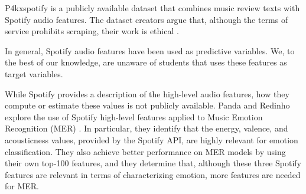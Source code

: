 \documentclass[sn-mathphys]{sn-jnl}%
\theoremstyle{thmstyleone}%
\theoremstyle{thmstyletwo}%
\theoremstyle{thmstylethree}%
\begin{document}
P4kxspotify is a publicly available dataset that combines music review texts with Spotify audio features.
The dataset creators argue that, although the terms of service prohibits scraping, their work is ethical \cite{pinter2020p4kxspotify}.

In general, Spotify audio features have been used as predictive variables.
We, to the best of our knowledge, are unaware of students that uses these features as target variables.


While Spotify provides a description of the high-level audio features, how they compute or estimate these values is not publicly available.
Panda and Redinho explore the use of Spotify high-level features applied to Music Emotion Recognition (MER) \cite{panda2021does}.
In particular, they identify that the energy, valence, and acousticness values, provided by the Spotify API,
are highly relevant for emotion classification.
They also achieve better performance on MER models by using their own top-100 features, and they determine that,
although these three Spotify features are relevant in terms of characterizing emotion, more features are needed for MER.







\end{document}
